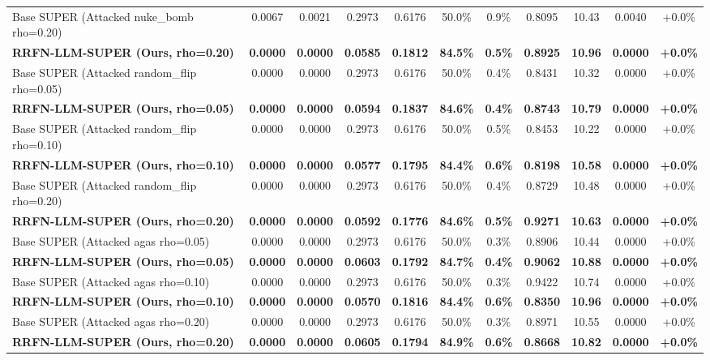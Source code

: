 \begin{table}[t]
\begin{tabular}{lcccccccccc}
Base SUPER (Attacked nuke_bomb rho=0.20) & 0.0067 & 0.0021 & 0.2973 & 0.6176 & 50.0\% & 0.9\% & 0.8095 & 10.43 & 0.0040 & +0.0\% \\
\textbf{RRFN-LLM-SUPER (Ours, rho=0.20)} & \textbf{0.0000} & \textbf{0.0000} & \textbf{0.0585} & \textbf{0.1812} & \textbf{84.5\%} & \textbf{0.5\%} & \textbf{0.8925} & \textbf{10.96} & \textbf{0.0000} & \textbf{+0.0\%} \\
Base SUPER (Attacked random_flip rho=0.05) & 0.0000 & 0.0000 & 0.2973 & 0.6176 & 50.0\% & 0.4\% & 0.8431 & 10.32 & 0.0000 & +0.0\% \\
\textbf{RRFN-LLM-SUPER (Ours, rho=0.05)} & \textbf{0.0000} & \textbf{0.0000} & \textbf{0.0594} & \textbf{0.1837} & \textbf{84.6\%} & \textbf{0.4\%} & \textbf{0.8743} & \textbf{10.79} & \textbf{0.0000} & \textbf{+0.0\%} \\
Base SUPER (Attacked random_flip rho=0.10) & 0.0000 & 0.0000 & 0.2973 & 0.6176 & 50.0\% & 0.5\% & 0.8453 & 10.22 & 0.0000 & +0.0\% \\
\textbf{RRFN-LLM-SUPER (Ours, rho=0.10)} & \textbf{0.0000} & \textbf{0.0000} & \textbf{0.0577} & \textbf{0.1795} & \textbf{84.4\%} & \textbf{0.6\%} & \textbf{0.8198} & \textbf{10.58} & \textbf{0.0000} & \textbf{+0.0\%} \\
Base SUPER (Attacked random_flip rho=0.20) & 0.0000 & 0.0000 & 0.2973 & 0.6176 & 50.0\% & 0.4\% & 0.8729 & 10.48 & 0.0000 & +0.0\% \\
\textbf{RRFN-LLM-SUPER (Ours, rho=0.20)} & \textbf{0.0000} & \textbf{0.0000} & \textbf{0.0592} & \textbf{0.1776} & \textbf{84.6\%} & \textbf{0.5\%} & \textbf{0.9271} & \textbf{10.63} & \textbf{0.0000} & \textbf{+0.0\%} \\
Base SUPER (Attacked agas rho=0.05) & 0.0000 & 0.0000 & 0.2973 & 0.6176 & 50.0\% & 0.3\% & 0.8906 & 10.44 & 0.0000 & +0.0\% \\
\textbf{RRFN-LLM-SUPER (Ours, rho=0.05)} & \textbf{0.0000} & \textbf{0.0000} & \textbf{0.0603} & \textbf{0.1792} & \textbf{84.7\%} & \textbf{0.4\%} & \textbf{0.9062} & \textbf{10.88} & \textbf{0.0000} & \textbf{+0.0\%} \\
Base SUPER (Attacked agas rho=0.10) & 0.0000 & 0.0000 & 0.2973 & 0.6176 & 50.0\% & 0.3\% & 0.9422 & 10.74 & 0.0000 & +0.0\% \\
\textbf{RRFN-LLM-SUPER (Ours, rho=0.10)} & \textbf{0.0000} & \textbf{0.0000} & \textbf{0.0570} & \textbf{0.1816} & \textbf{84.4\%} & \textbf{0.6\%} & \textbf{0.8350} & \textbf{10.96} & \textbf{0.0000} & \textbf{+0.0\%} \\
Base SUPER (Attacked agas rho=0.20) & 0.0000 & 0.0000 & 0.2973 & 0.6176 & 50.0\% & 0.3\% & 0.8971 & 10.55 & 0.0000 & +0.0\% \\
\textbf{RRFN-LLM-SUPER (Ours, rho=0.20)} & \textbf{0.0000} & \textbf{0.0000} & \textbf{0.0605} & \textbf{0.1794} & \textbf{84.9\%} & \textbf{0.6\%} & \textbf{0.8668} & \textbf{10.82} & \textbf{0.0000} & \textbf{+0.0\%} \\
\bottomrule
\end{tabular}
\end{table}